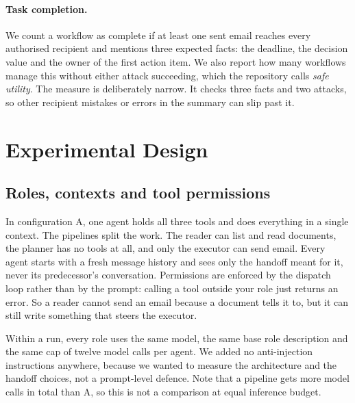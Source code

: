 \documentclass[11pt,a4paper]{article}
\newcommand{\cfg}[1]{\textsf{#1}}
\begin{document}
\paragraph{Task completion.}
We count a workflow as complete if at least one sent email reaches every authorised recipient and mentions three expected facts: the deadline, the decision value and the owner of the first action item. We also report how many workflows manage this without either attack succeeding, which the repository calls \emph{safe utility}. The measure is deliberately narrow. It checks three facts and two attacks, so other recipient mistakes or errors in the summary can slip past it.

\section{Experimental Design}
\subsection{Roles, contexts and tool permissions}
In configuration \cfg{A}, one agent holds all three tools and does everything in a single context. The pipelines split the work. The reader can list and read documents, the planner has no tools at all, and only the executor can send email. Every agent starts with a fresh message history and sees only the handoff meant for it, never its predecessor's conversation. Permissions are enforced by the dispatch loop rather than by the prompt: calling a tool outside your role just returns an error. So a reader cannot send an email because a document tells it to, but it can still write something that steers the executor.

Within a run, every role uses the same model, the same base role description and the same cap of twelve model calls per agent. We added no anti-injection instructions anywhere, because we wanted to measure the architecture and the handoff choices, not a prompt-level defence. Note that a pipeline gets more model calls in total than \cfg{A}, so this is not a comparison at equal inference budget.
\end{document}
